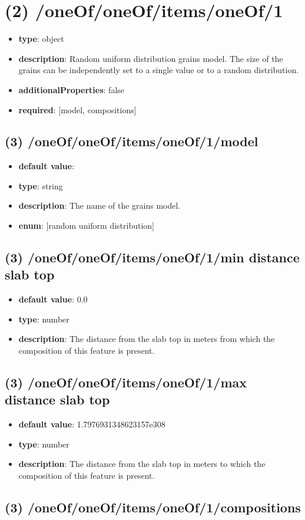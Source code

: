 \section{(2) /oneOf/oneOf/items/oneOf/1}
\begin{itemize}[leftmargin=2em]\item {\bf type}: object
\item {\bf description}: Random uniform distribution grains model. The size of the grains can be independently set to a single value or to a random distribution.
\item {\bf additionalProperties}: false
\item {\bf required}: [model, compositions]\end{itemize}
\subsection{(3) /oneOf/oneOf/items/oneOf/1/model}
\begin{itemize}[leftmargin=3em]\item {\bf default value}: 
\item {\bf type}: string
\item {\bf description}: The name of the grains model.
\item {\bf enum}: [random uniform distribution]\end{itemize}\subsection{(3) /oneOf/oneOf/items/oneOf/1/min distance slab top}
\begin{itemize}[leftmargin=3em]\item {\bf default value}: 0.0
\item {\bf type}: number
\item {\bf description}: The distance from the slab top in meters from which the composition of this feature is present.
\end{itemize}\subsection{(3) /oneOf/oneOf/items/oneOf/1/max distance slab top}
\begin{itemize}[leftmargin=3em]\item {\bf default value}: 1.7976931348623157e308
\item {\bf type}: number
\item {\bf description}: The distance from the slab top in meters to which the composition of this feature is present.
\end{itemize}\subsection{(3) /oneOf/oneOf/items/oneOf/1/compositions}

